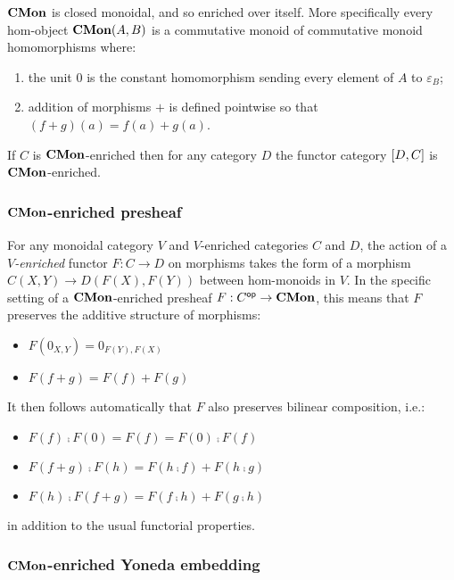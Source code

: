 $\mathbf{CMon}$ is closed monoidal, and so enriched over itself. More specifically every hom-object $\mathbf{CMon}(A,B)$ is a
commutative monoid of commutative monoid homomorphisms where:

\begin{enumerate}
\item the unit $0$ is the constant homomorphism sending every element of $A$ to $\varepsilon_B$;
\item addition of morphisms $+$ is defined pointwise so that $(f + g)(a) = f(a) + g(a)$.
\end{enumerate}

\begin{proposition}
If $C$ is $\mathbf{CMon}$-enriched then for any category $D$ the functor category $[D,C]$ is $\mathbf{CMon}$-enriched.
\end{proposition}

\subsubsection{$\mathbf{CMon}$-enriched presheaf}

For any monoidal category $V$ and $V$-enriched categories $C$ and $D$, the action of a \emph{$V$-enriched}
functor $F: C \to D$ on morphisms takes the form of a morphism $C(X,Y) \to D(F(X),F(Y))$ between hom-monoids
in $V$. In the specific setting of a $\mathbf{CMon}$-enriched presheaf $F: C^{\mathsf{op}} \to \mathbf{CMon}$, this means that $F$
preserves the additive structure of morphisms:
\begin{itemize}
\item $F(0_{X,Y}) = 0_{F(Y),F(X)}$
\item $F(f + g) = F(f) + F(g)$
\end{itemize}
It then follows automatically that $F$ also preserves bilinear composition, i.e.:
\begin{itemize}
\item $F(f) \comp F(0) = F(f) = F(0) \comp F(f)$
\item $F(f + g) \comp F(h) = F(h \comp f) + F(h \comp g)$
\item $F(h) \comp F(f + g) = F(f \comp h) + F(g \comp h)$
\end{itemize}
in addition to the usual functorial properties.

\subsubsection{$\mathbf{CMon}$-enriched Yoneda embedding}

